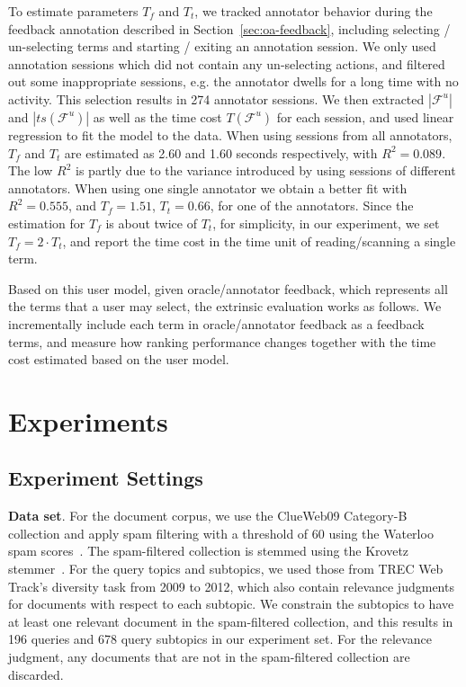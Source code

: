 To estimate parameters $T_f$ and $T_t$, we tracked annotator behavior during the feedback annotation described in Section~\ref{sec:oa-feedback}, including selecting / un-selecting terms and starting / exiting an annotation session. We only used annotation sessions which did not contain any un-selecting actions, and filtered out some inappropriate sessions, e.g. the annotator dwells for a long time with no activity. This selection results in 274 annotator sessions. We then extracted $|\mathcal{F}^u|$ and $|ts(\mathcal{F}^u)|$ as well as the time cost $T(\mathcal{F}^u)$ for each session, and used linear regression to fit the model to the data. When using sessions from all annotators, $T_f$ and $T_t$ are estimated as 2.60 and 1.60 seconds respectively, with $R^2=0.089$. The low $R^2$ is partly due to the variance introduced by using sessions of different annotators. When using one single annotator we obtain a better fit with $R^2=0.555$, and $T_f=1.51$, $T_t=0.66$, for one of the annotators. Since the 
estimation for $T_f$ is about twice of $T_t$, for simplicity, in our experiment, we set $T_f=2\cdot T_t$, and report the time cost in the time unit of reading/scanning a single term.

Based on this user model, given oracle/annotator feedback, which represents all the terms that a user may select, the extrinsic evaluation works as follows. We incrementally include each term in oracle/annotator feedback as a feedback terms, and measure how ranking performance changes together with the time cost estimated based on the user model. 

\section{Experiments} \label{sec:ee-exp}
\subsection{Experiment Settings}
\textbf{Data set}. For the document corpus, we use the ClueWeb09 Category-B collection and apply spam filtering with a threshold of 60 using the Waterloo spam scores~\cite{cormack2011efficient}. The spam-filtered collection is stemmed using the Krovetz stemmer~\cite{krovetz1993viewing}. For the query topics and subtopics, we used those from TREC Web Track's diversity task from 2009 to 2012, which also contain relevance judgments for documents with respect to each subtopic. We constrain the subtopics to have at least one relevant document in the spam-filtered collection, and this results in 196 queries and 678 query subtopics in our experiment set. For the relevance judgment, any documents that are not in the spam-filtered collection are discarded.

